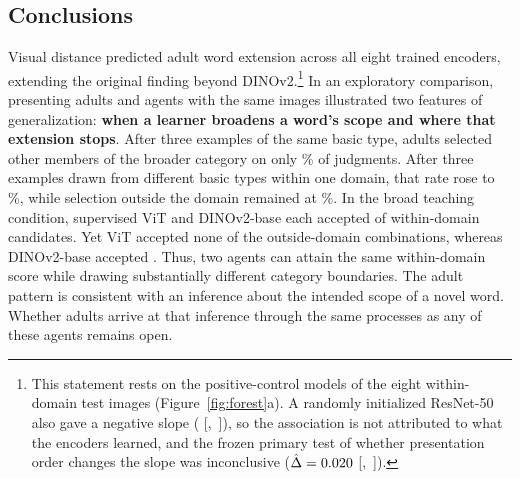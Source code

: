 \documentclass[11pt]{article}
\begin{document}
\subsection{Conclusions}

Visual distance predicted adult word extension across all eight trained encoders, extending the original finding beyond DINOv2.\footnote{This statement rests on the positive-control models of the eight within-domain test images (Figure~\ref{fig:forest}a). A randomly initialized ResNet-50 also gave a negative slope (\VtPcRandB{} [\VtPcRandLo,~\VtPcRandHi]), so the association is not attributed to what the encoders learned, and the frozen primary test of whether presentation order changes the slope was inconclusive ($\hat\Delta = 0.020$ [\VtOrdLo,~\VtOrdHi]).} In an exploratory comparison, presenting adults and agents with the same images illustrated two features of generalization: \textbf{when a learner broadens a word’s scope and where that extension stops}. After three examples of the same basic type, adults selected other members of the broader category on only \VtXSameBasicPct\% of judgments. After three examples drawn from different basic types within one domain, that rate rose to \VtXBroadPct\%, while selection outside the domain remained at \VtXOutBroadPct\%. In the broad teaching condition, supervised ViT and DINOv2-base each accepted \VtXViTIn{} of \VtXInN{} within-domain candidates. Yet ViT accepted none of the \VtXOutN{} outside-domain combinations, whereas DINOv2-base accepted \VtXDinoBOut. Thus, two agents can attain the same within-domain score while drawing substantially different category boundaries. The adult pattern is consistent with an inference about the intended scope of a novel word. Whether adults arrive at that inference through the same processes as any of these agents remains open.
\end{document}
